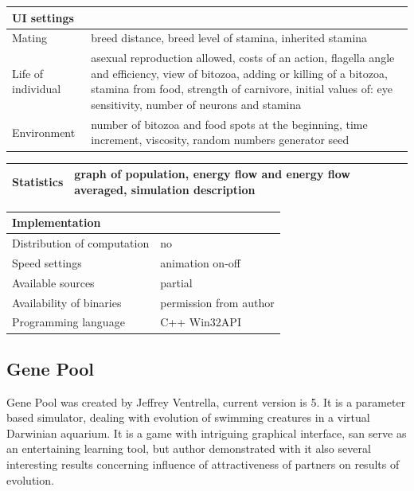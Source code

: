 \documentclass[a4paper,12pt]{report}
\begin{document}
\vspace{10pt}
\begin{tabular}{|p{150pt}|p{220pt}|}
\hline 	\textbf  {UI settings}&\\ \hline
Mating&breed distance, breed level of stamina, inherited stamina\\ \hline
Life of individual&asexual reproduction allowed, costs of an action, flagella angle and efficiency, view of bitozoa, adding or killing of a bitozoa, stamina from food, strength of carnivore, initial values of: eye sensitivity, number of neurons and stamina\\ \hline
Environment&number of bitozoa and food spots at the beginning, time increment, viscosity, random numbers generator seed\\ \hline
\end{tabular} 

\vspace{10pt}
\begin{tabular}{|p{150pt}|p{220pt}|}
\hline 	\textbf  {Statistics}&graph of population, energy flow and energy flow averaged, simulation description\\ \hline
\end{tabular} 

\vspace{10pt}
\begin{tabular}{|p{150pt}|p{220pt}|}\hline 	
\textbf  {Implementation}&\\ \hline
Distribution of computation&no\\ \hline
Speed settings&animation on-off\\ \hline
Available sources&partial\\ \hline
Availability of binaries&permission from author\\ \hline
Programming language&C++ Win32API\\ \hline
\end{tabular}

\subsection {Gene Pool}
Gene Pool was created by Jeffrey Ventrella, current version is 5. It is a parameter based simulator, dealing with evolution of swimming creatures in a virtual Darwinian aquarium. It is a game with intriguing graphical interface, san serve as an entertaining learning tool, but author demonstrated with it also several interesting results concerning influence of attractiveness of partners on  results of evolution.\cite{GenePool1} \cite{GenePool2}
\end{document}
